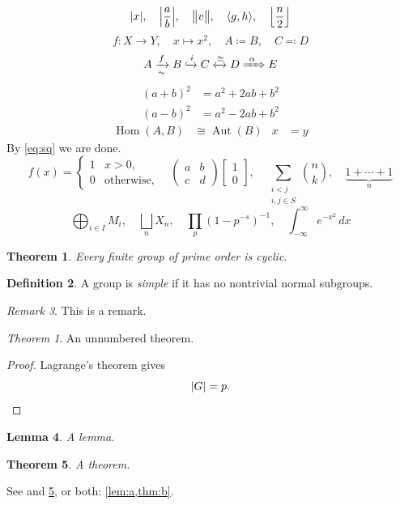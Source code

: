 \documentclass{amsart}
\DeclarePairedDelimiter{\gen}{\langle}{\rangle}
\DeclarePairedDelimiter{\abs}{\lvert}{\rvert}
\DeclarePairedDelimiter{\floor}{\lfloor}{\rfloor}
\DeclarePairedDelimiter{\norm}{\lVert}{\rVert}
\DeclareMathOperator{\Hom}{Hom}
\DeclareMathOperator{\Aut}{Aut}
\newtheorem{thm}{Theorem}
\newtheorem{lem}[thm]{Lemma}
\theoremstyle{definition}
\newtheorem{defn}[thm]{Definition}
\theoremstyle{remark}
\newtheorem{rmk}[thm]{Remark}
\newtheorem*{thm*}{Theorem}
\begin{document}
\[ \abs{x}, \quad \abs*{\frac{a}{b}}, \quad \norm[\big]{v}, \quad \gen{g, h}, \quad \floor*{\frac{n}{2}} \]
\[ f \colon X \to Y, \quad x \mapsto x^2, \quad A \coloneqq B, \quad C \eqqcolon D \]
\[ A \xrightarrow[\sim]{f} B \xhookrightarrow{i} C \xleftrightarrow{\cong} D \xRightarrow{\ \alpha\ } E \]
\begin{align}
  (a+b)^2 &= a^2 + 2ab + b^2 \label{eq:sq} \\
  (a-b)^2 &= a^2 - 2ab + b^2
\end{align}
\begin{align*}
  \Hom(A, B) &\cong \Aut(B) & x &= y
\end{align*}
By \eqref{eq:sq} we are done.
\[ f(x) = \begin{cases} 1 & x > 0, \\ 0 & \text{otherwise}, \end{cases}
   \quad \begin{pmatrix} a & b \\ c & d \end{pmatrix}
   \begin{bmatrix} 1 \\ 0 \end{bmatrix},
   \quad \sum_{\substack{i < j \\ i,j \in S}} \binom{n}{k},
   \quad \underbrace{1 + \cdots + 1}_{n} \]
\[ \bigoplus_{i \in I} M_i, \quad \bigsqcup_{n} X_n, \quad \prod_{p} (1 - p^{-s})^{-1}, \quad \int_{-\infty}^{\infty} e^{-x^2} \, dx \]
\begin{thm}\label{thm:main}
  Every finite group of prime order is cyclic.
\end{thm}
\begin{defn}
  A group is \emph{simple} if it has no nontrivial normal subgroups.
\end{defn}
\begin{rmk}
  This is a remark.
\end{rmk}
\begin{thm*}
  An unnumbered theorem.
\end{thm*}
\begin{proof}
  Lagrange's theorem gives
  \[ |G| = p. \qedhere \]
\end{proof}
\begin{lem}\label{lem:a}
  A lemma.
\end{lem}
\begin{thm}\label{thm:b}
  A theorem.
\end{thm}
See  and \cref{thm:b}, or both: \cref{lem:a,thm:b}.
\end{document}
